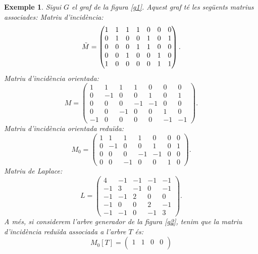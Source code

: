 \documentclass{article}
\newtheorem{example}{Exemple}[section]
\begin{document}
    \begin{example}\label{exempl1}
        Sigui $G$ el graf de la figura \ref{g1}. Aquest graf té les següents matrius associades:\newline
        Matriu d'incidència:
        $$\Tilde{M}=
        \begin{pmatrix}
            1 & 1 & 1 & 1 & 0 & 0 & 0 \\
            0 & 1 & 0 & 0 & 1 & 0 & 1 \\
            0 & 0 & 0 & 1 & 1 & 0 & 0 \\
            0 & 0 & 1 & 0 & 0 & 1 & 0 \\
            1 & 0 & 0 & 0 & 0 & 1 & 1
        \end{pmatrix}.
        $$
        Matriu d'incidència orientada:
        $$M=
        \begin{pmatrix}
            1 & 1 & 1 & 1 & 0 & 0 & 0 \\
            0 & -1 & 0 & 0 & 1 & 0 & 1 \\
            0 & 0 & 0 & -1 & -1 & 0 & 0 \\
            0 & 0 & -1 & 0 & 0 & 1 & 0 \\
            -1 & 0 & 0 & 0 & 0 & -1 & -1
        \end{pmatrix}.
        $$
        Matriu d'incidència orientada reduïda:
        $$M_0=
        \begin{pmatrix}
            1 & 1 & 1 & 1 & 0 & 0 & 0 \\
            0 & -1 & 0 & 0 & 1 & 0 & 1 \\
            0 & 0 & 0 & -1 & -1 & 0 & 0 \\
            0 & 0 & -1 & 0 & 0 & 1 & 0
        \end{pmatrix}.
        $$
        Matriu de Laplace:
        $$L=
        \begin{pmatrix}
            4 & -1 & -1 & -1 & -1 \\
            -1 & 3 & -1 & 0 & -1 \\
            -1 & -1 & 2 & 0 & 0 \\
            -1 & 0 & 0 & 2 & -1 \\
            -1 & -1 & 0 & -1 & 3
        \end{pmatrix}.
        $$
        A més, si considerem l'arbre generador de la figura \ref{g2}, tenim que la matriu d'incidència reduïda associada a l'arbre $T$ és:
        $$M_0[T]=
        \begin{pmatrix}
            1 & 1 & 0 & 0 \\

\end{pmatrix}$$
\end{example}
\end{document}
